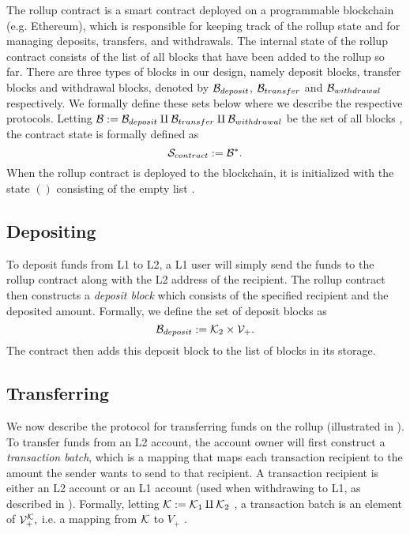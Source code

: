 The rollup contract is a smart contract deployed on a programmable blockchain (e.g. Ethereum), which is responsible for keeping track of the rollup state and for managing deposits, transfers, and withdrawals. The internal state of the rollup contract consists of the list of all blocks that have been added to the rollup so far. There are three types of blocks in our design, namely deposit blocks, transfer blocks and withdrawal blocks, denoted by \(\mathcal{B}_{deposit}\), \(\mathcal{B}_{transfer}\) and \(\mathcal{B}_{withdrawal}\) respectively. We formally define these sets below where we describe the respective protocols. Letting \(\mathcal{B} := \mathcal{B}_{deposit} \amalg \mathcal{B}_{transfer} \amalg \mathcal{B}_{withdrawal}\) be the set of all blocks \href{https://github.com/\repo FVIntmax/Block.lean#L14}{\ExternalLink}, the contract state is formally defined \href{https://github.com/\repo FVIntmax/Block.lean#L115}{\ExternalLink} as \[\mathcal{S}_{contract} := \mathcal{B}^*.\] When the rollup contract is deployed to the blockchain, it is initialized with the state \(()\) consisting of the empty list \href{https://github.com/\repo FVIntmax/Block.lean#L125}{\ExternalLink}.

\subsection{Depositing}\label{section:depositing}

To deposit funds from L1 to L2, a L1 user will simply send the funds to the rollup contract along with the L2 address of the recipient. The rollup contract then constructs a \emph{deposit block} which consists of the specified recipient and the deposited amount. Formally, we define \href{https://github.com/\repo FVIntmax/Block.lean#L18}{\ExternalLink} the set of deposit blocks as \[\mathcal{B}_{deposit} := \mathcal{K}_2 \times \mathcal{V}_+.\] The contract then adds this deposit block to the list of blocks in its storage.

\subsection{Transferring}\label{section:transferring}

We now describe the protocol for transferring funds on the rollup (illustrated in ). To transfer funds from an L2 account, the account owner will first construct a \emph{transaction batch}, which is a mapping that maps each transaction recipient to the amount the sender wants to send to that recipient. A transaction recipient is either an L2 account or an L1 account (used when withdrawing to L1, as described in ). Formally, letting \(\mathcal{K} := \mathcal{K}_1 \amalg \mathcal{K}_2\) \href{https://github.com/\repo FVIntmax/Key.lean#L14}{\ExternalLink}, a transaction batch is an element of \(\mathcal{V}_+^{\mathcal{K}},\) i.e. a mapping from \(\mathcal{K}\) to \(V_+\) \href{https://github.com/\repo FVIntmax/TransactionBatch.lean#L22}{\ExternalLink}.

